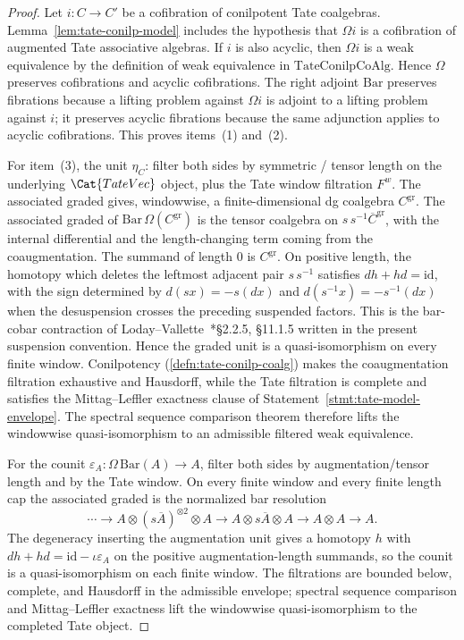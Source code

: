 \begin{proof}
  Let \(i:C\to C'\) be a cofibration of conilpotent Tate coalgebras.
  Lemma~\ref{lem:tate-conilp-model} includes the hypothesis that
  \(\Omega i\) is a cofibration of augmented Tate associative algebras.
  If \(i\) is also acyclic, then \(\Omega i\) is a weak equivalence by
  the definition of weak equivalence in
  \(\mathrm{TateConilpCoAlg}\).  Hence \(\Omega\) preserves
  cofibrations and acyclic cofibrations.  The right adjoint
  \(\mathrm{Bar}\) preserves fibrations because a lifting problem against
  \(\Omega i\) is adjoint to a lifting problem against \(i\); it
  preserves acyclic fibrations because the same adjunction applies to
  acyclic cofibrations.  This proves items~(1) and~(2).

  For item~(3), the unit $\eta_C$: filter both sides by symmetric
  / tensor length on the underlying $\Cat{TateVec}$ object, plus
  the Tate window filtration $F^w$. The associated graded gives,
  windowwise, a finite-dimensional dg coalgebra \(C^{\mathrm{gr}}\).
  The associated graded of \(\mathrm{Bar}\,\Omega(C^{\mathrm{gr}})\)
  is the tensor coalgebra on
  \(s\,s^{-1}\overline C^{\mathrm{gr}}\), with the internal
  differential and the length-changing term coming from the
  coaugmentation.  The summand of length \(0\) is
  \(C^{\mathrm{gr}}\).  On positive length, the homotopy which deletes
  the leftmost adjacent pair \(s\,s^{-1}\) satisfies
  \(dh+hd=\mathrm{id}\), with the sign determined by
  \(d(sx)=-s(dx)\) and \(d(s^{-1}x)=-s^{-1}(dx)\) when the
  desuspension crosses the preceding suspended factors.  This is the
  bar-cobar contraction of
  Loday--Vallette~\cite{loday-vallette}*{\S 2.2.5, \S 11.1.5} written in
  the present suspension convention.  Hence the graded unit is a
  quasi-isomorphism on every finite window.  Conilpotency
  (\ref{defn:tate-conilp-coalg}) makes the coaugmentation filtration
  exhaustive and Hausdorff, while the Tate filtration is complete and
  satisfies the Mittag--Leffler exactness clause of
  Statement~\ref{stmt:tate-model-envelope}.  The spectral sequence
  comparison theorem therefore lifts the windowwise quasi-isomorphism to
  an admissible filtered weak equivalence.

  For the counit
  \(\varepsilon_A\colon\Omega\,\mathrm{Bar}(A)\to A\), filter both
  sides by augmentation/tensor length and by the Tate window.  On every
  finite window and every finite length cap the associated graded is the
  normalized bar resolution
  \[
    \cdots\to A\otimes (s\overline A)^{\otimes 2}\otimes A
      \to A\otimes s\overline A\otimes A\to A\otimes A\to A .
  \]
  The degeneracy inserting the augmentation unit gives a homotopy
  \(h\) with \(dh+hd=\mathrm{id}-\iota\varepsilon_A\) on the positive
  augmentation-length summands, so the counit is a quasi-isomorphism on
  each finite window.  The filtrations are bounded below, complete, and
  Hausdorff in the admissible envelope; spectral sequence comparison and
  Mittag--Leffler exactness lift the windowwise quasi-isomorphism to the
  completed Tate object.


\end{proof}
